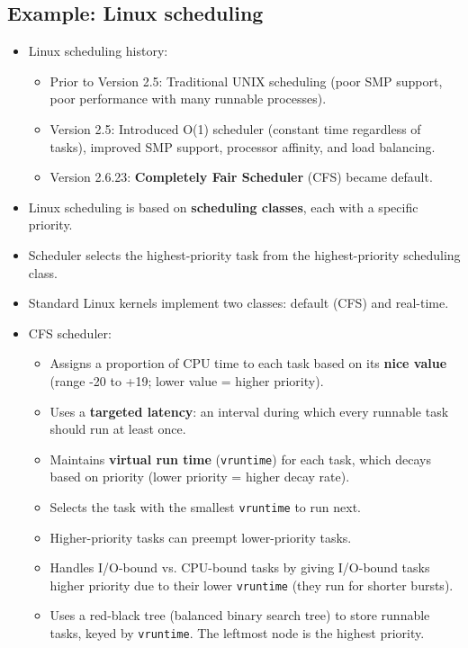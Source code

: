 \subsection{Example: Linux scheduling}
\begin{itemize}
    \item Linux scheduling history:
        \begin{itemize}
            \item Prior to Version 2.5: Traditional UNIX scheduling (poor SMP support, poor performance with many runnable processes).
            \item Version 2.5: Introduced O(1) scheduler (constant time regardless of tasks), improved SMP support, processor affinity, and load balancing.
            \item Version 2.6.23: \textbf{Completely Fair Scheduler} (CFS) became default.
        \end{itemize}
    \item Linux scheduling is based on \textbf{scheduling classes}, each with a specific priority.
    \item Scheduler selects the highest-priority task from the highest-priority scheduling class.
    \item Standard Linux kernels implement two classes: default (CFS) and real-time.
    \item CFS scheduler:
        \begin{itemize}
            \item Assigns a proportion of CPU time to each task based on its \textbf{nice value} (range -20 to +19; lower value = higher priority).
            \item Uses a \textbf{targeted latency}: an interval during which every runnable task should run at least once.
            \item Maintains \textbf{virtual run time} (\texttt{vruntime}) for each task, which decays based on priority (lower priority = higher decay rate).
            \item Selects the task with the smallest \texttt{vruntime} to run next.
            \item Higher-priority tasks can preempt lower-priority tasks.
            \item Handles I/O-bound vs. CPU-bound tasks by giving I/O-bound tasks higher priority due to their lower \texttt{vruntime} (they run for shorter bursts).
            \item Uses a red-black tree (balanced binary search tree) to store runnable tasks, keyed by \texttt{vruntime}. The leftmost node is the highest priority.

\end{itemize}
\end{itemize}
